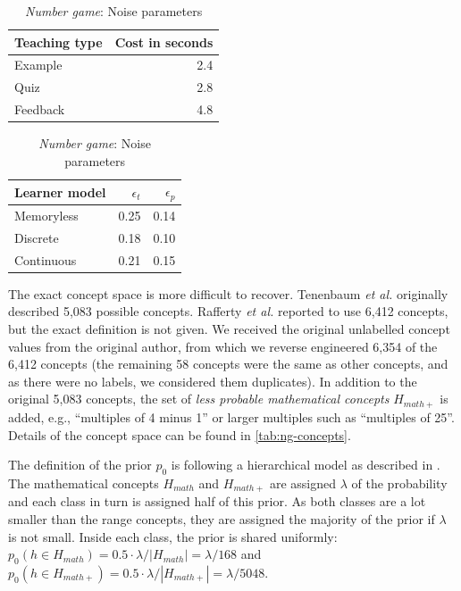 \begin{table}
\small
\parbox[t]{.49\linewidth}{
    \centering
    \begin{tabular}{l|r}
        \hline
        \textbf{Teaching type} & \textbf{Cost} in seconds \\
        \hline
        Example & 2.4 \\
        Quiz    & 2.8 \\
        Feedback & 4.8 \\
        \hline
    \end{tabular}
    \caption{\textit{Number game}: Teaching activity costs}
    \label{tab:action-cost-t2}
}
\hfill
\parbox[t]{.49\linewidth}{
    \centering
    \begin{tabular}{l|rr}
        \hline
        \textbf{Learner model} & $\epsilon_t$ & $\epsilon_p$ \\
        \hline
        Memoryless  & 0.25 & 0.14 \\
        Discrete    & 0.18 & 0.10 \\
        Continuous  & 0.21 & 0.15 \\
        \hline
    \end{tabular}
    \caption{\textit{Number game}: Noise parameters}
    \label{tab:noise-t2}
}
\end{table}

The exact concept space is more difficult to recover. Tenenbaum \textit{et al.} \cite{tenenbaum2000rules} originally described 5,083 possible concepts. Rafferty \textit{et al.} reported to use 6,412 concepts, but the exact definition is not given. 
We received the original unlabelled concept values from the original author, from which we reverse engineered 6,354 of the 6,412 concepts (the remaining 58 concepts were the same as other concepts, and as there were no labels, we considered them duplicates).
In addition to the original 5,083 concepts, the set of \textit{less probable mathematical concepts} $H_{math+}$ is added, e.g., ``multiples of 4 minus 1'' or larger multiples such as ``multiples of 25''.
Details of the concept space can be found in \autoref{tab:ng-concepts}.

The definition of the prior $p_0$ is following a hierarchical model as described in \cite{tenenbaum2000rules}. 
The mathematical concepts $H_{math}$ and $H_{math+}$ are assigned $\lambda$ of the probability and each class in turn is assigned half of this prior.
As both classes are a lot smaller than the range concepts, they are assigned the majority of the prior if $\lambda$ is not small.
Inside each class, the prior is shared uniformly: $p_0(h \in H_{math}) = 0.5 \cdot \lambda / |H_{math}|= \lambda / 168$ and $p_0(h \in H_{math+}) = 0.5 \cdot \lambda / |H_{math+}|= \lambda / 5048$. 

